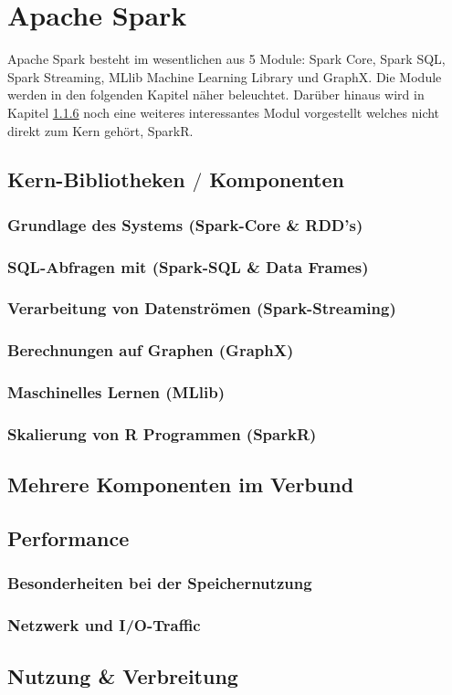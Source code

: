 \newpage
\chapter{Apache Spark} 

Apache Spark besteht im wesentlichen aus 5 Module: Spark Core, Spark SQL, Spark Streaming, MLlib Machine Learning Library und GraphX. 
Die Module werden in den folgenden Kapitel näher beleuchtet. 
Darüber hinaus wird in Kapitel \ref{sec_sparkr} noch eine weiteres interessantes Modul vorgestellt welches nicht direkt zum Kern gehört, SparkR.

\section{Kern-Bibliotheken $\slash$ Komponenten}

\subsection{Grundlage des Systems (Spark-Core \& RDD’s)}\label{sec_sparkcore}

\subsection{SQL-Abfragen mit (Spark-SQL \& Data Frames)}

\subsection{Verarbeitung von Datenströmen (Spark-Streaming)}

\subsection{Berechnungen auf Graphen (GraphX)}

\subsection{Maschinelles Lernen (MLlib)}

\subsection{Skalierung von R Programmen (SparkR)}\label{sec_sparkr}

\section{Mehrere Komponenten im Verbund}
\section{Performance}
\subsection{Besonderheiten bei der Speichernutzung}
\subsection{Netzwerk und I/O-Traffic}
\section{Nutzung \& Verbreitung}
